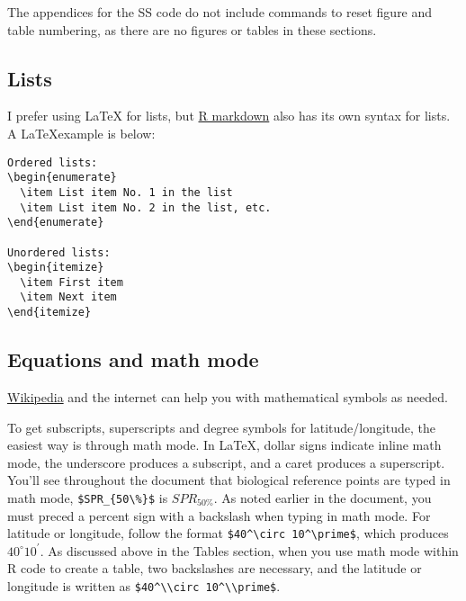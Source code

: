 \documentclass[12pt,]{article}
\begin{document}
The appendices for the SS code do not include commands to reset figure
and table numbering, as there are no figures or tables in these
sections.

\subsection{Lists}\label{lists}

I prefer using LaTeX for lists, but
\href{http://rmarkdown.rstudio.com/authoring_basics.html}{R markdown}
also has its own syntax for lists. A \LaTeX example is below:

\begin{Verbatim}[frame=single]
Ordered lists:
\begin{enumerate}
  \item List item No. 1 in the list
  \item List item No. 2 in the list, etc.
\end{enumerate} 

Unordered lists:
\begin{itemize}
  \item First item
  \item Next item
\end{itemize} 
\end{Verbatim}

\subsection{Equations and math mode}\label{equations-and-math-mode}

\href{https://en.wikibooks.org/wiki/LaTeX/Mathematics}{Wikipedia} and
the internet can help you with mathematical symbols as needed.

To get subscripts, superscripts and degree symbols for
latitude/longitude, the easiest way is through math mode. In LaTeX,
dollar signs indicate inline math mode, the underscore produces a
subscript, and a caret produces a superscript. You'll see throughout the
document that biological reference points are typed in math mode,
\verb|$SPR_{50\%}$| is \(SPR_{50\%}\). As noted earlier in the document,
you must preced a percent sign with a backslash when typing in math
mode. For latitude or longitude, follow the format
\verb|$40^\circ 10^\prime$|, which produces \(40^\circ 10^\prime\). As
discussed above in the Tables section, when you use math mode within R
code to create a table, two backslashes are necessary, and the latitude
or longitude is written as \verb|$40^\\circ 10^\\prime$|.
\end{document}
